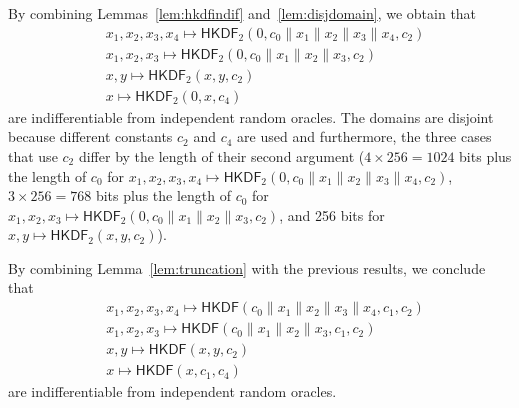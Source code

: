 \documentclass[compsoc, conference, letterpaper, 10pt, times]{IEEEtran}
\newcommand{\HKDF}{\mathsf{HKDF}}
\newcommand{\hkdftwo}{\HKDF_2}
\begin{document}
By combining Lemmas~\ref{lem:hkdfindif} and~\ref{lem:disjdomain}, we obtain that
\begin{align*}
&x_1,x_2,x_3,x_4 \mapsto \hkdftwo(0, c_0 \| x_1 \| x_2 \| x_3 \| x_4, c_2)\\
&x_1,x_2,x_3 \mapsto \hkdftwo(0, c_0 \| x_1 \| x_2 \| x_3, c_2)\\
&x,y \mapsto \hkdftwo(x,y,c_2)\\
 &x \mapsto \hkdftwo(0,x,c_4)
\end{align*}
are indifferentiable from independent random oracles.
The domains are disjoint 
because different constants $c_2$ and $c_4$ are used and furthermore, the three cases that use $c_2$ differ by the length of their second argument ($4 \times 256 = 1024$ bits plus the length of $c_0$ for
$x_1,x_2,x_3,x_4 \mapsto \hkdftwo(0, c_0 \| x_1 \| x_2 \| x_3 \| x_4, c_2)$,
$3 \times 256 = 768$ bits plus the length of $c_0$ for 
$x_1,x_2,x_3 \mapsto \hkdftwo(0, c_0 \| x_1 \| x_2 \| x_3, c_2)$, and 256 bits for $x,y \mapsto \hkdftwo(x,y,c_2)$).


By combining Lemma~\ref{lem:truncation} with the previous results,
we conclude that 
\begin{align*}
&x_1,x_2,x_3,x_4 \mapsto \HKDF(c_0 \| x_1 \| x_2 \| x_3 \| x_4, c_1, c_2)\\
&x_1,x_2,x_3 \mapsto \HKDF(c_0 \| x_1 \| x_2 \| x_3, c_1, c_2)\\
&x,y \mapsto \HKDF(x,y,c_2)\\
&x \mapsto \HKDF(x,c_1,c_4)
\end{align*} 
are indifferentiable from independent random oracles.



\end{document}
